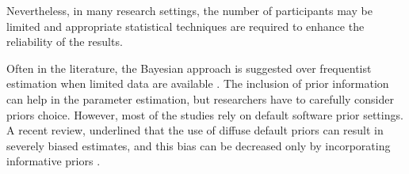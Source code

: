 \documentclass[graybox]{svmult}
\begin{document}
Nevertheless, in many research settings, the number of participants may be limited and appropriate statistical techniques are required to enhance the reliability of the results.

Often in the literature, the Bayesian approach is suggested over frequentist estimation when limited data are available \cite{mcneishUsingBayesianMethods2016a}.  The inclusion of prior information can help in the parameter estimation, but researchers have to carefully consider priors choice.
However, most of the studies rely on default software prior settings. A recent review, underlined that the use of diffuse default priors can result in severely biased estimates, and this bias can be decreased only by incorporating informative priors \cite{smidBayesianFrequentistEstimation2020}.
\end{document}
